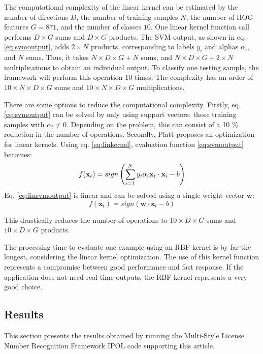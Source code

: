 \documentclass{ipol}
\def\x{{\mathbf x}}
\def\w{{\mathbf w}}
\begin{document}
The computational complexity of the linear kernel can be estimated by the number of directions $D$, the number of training samples $N$, the number of HOG features $G=871$, and the number of classes $10$.
One linear kernel function call performs $D \times G$ sums and $D \times G$ products.
The SVM output, as shown in eq. \ref{eq:svmoutput}, adds $2 \times N$ products, corresponding to labels $y_i$ and alphas $\alpha_i$, and $N$ sums.
Thus, it takes $N \times D \times G+N$ sums, and $N \times D \times G+2 \times N$ multiplications to obtain an individual output.
To classify one testing sample, the framework will perform this operation $10$ times.
The complexity has an order of $10 \times N \times D \times G$ sums and $10 \times N \times D \times G$ multiplications.

There are some options to reduce the computational complexity. 
Firstly, eq. \ref{eq:svmoutput} can be solved by only using support vectors: those training samples with $\alpha_i \neq 0$.
Depending on the problem, this can consist of a 10 \% reduction in the number of operations.
Secondly, Platt proposes an optimization for linear kernels.
Using eq. \ref{eq:linkernel}, evaluation function \ref{eq:svmoutput} becomes:
\begin{equation}\label{eq:linsvmoutput}
f(\x_t)= sign \left(\sum_{i=1}^N y_i \alpha_i \\ \x_t \cdot \x_i - b\right)
\end{equation}
Eq. \ref{eq:linsvmoutput} is linear and can be solved using a single weight vector $\w$:
\begin{equation}\label{eq:fastlinsvmoutput}
f(\x_t)= sign \left(\w \cdot \x_t - b\right)
\end{equation}

This drastically reduces the number of operations to $10 \times D \times G$ sums and $10 \times D \times G$ products.

The processing time to evaluate one example using an RBF kernel is by far the longest, considering the linear kernel optimization.
The use of this kernel function represents a compromise between good performance and fast response.
If the application does not need real time outputs, the RBF kernel represents a very good choice.

\subsection{Results}

This section presents the results obtained by running the Multi-Style License Number Recognition Framework IPOL code supporting this article.
\end{document}
